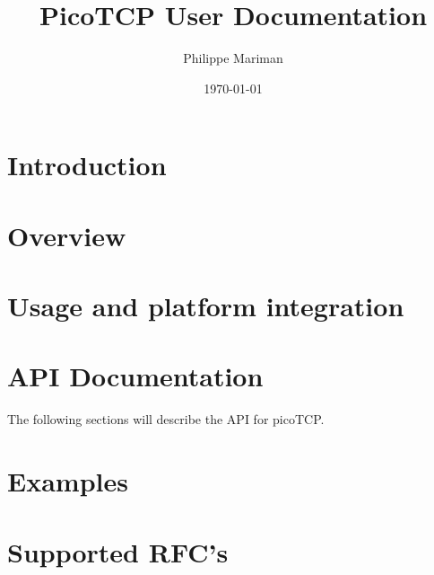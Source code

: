 %






\usepackage{hyperref}
\usepackage{longtable}
\usepackage{draftwatermark}




\title{PicoTCP User Documentation}
\author{Philippe Mariman}
\date{\today}
\maketitle

\thispagestyle{empty}



\tableofcontents

\chapter{Introduction}
\label{chap:intro}
%

\chapter{Overview}
\label{chap:overview}
%


\chapter{Usage and platform integration}
\label{chap:usage}
%


\chapter{API Documentation}
\label{chap:api_doc}
The following sections will describe the API for picoTCP.





\chapter{Examples}
\label{chap:examples}
%

\chapter{Supported RFC's}
\label{chap:rfcs}



